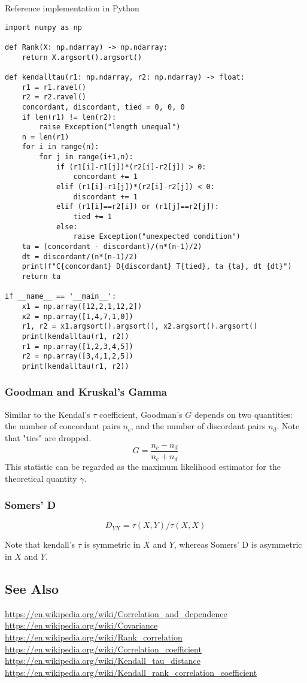 Reference implementation in Python
\begin{verbatim}
import numpy as np

def Rank(X: np.ndarray) -> np.ndarray:
    return X.argsort().argsort()

def kendalltau(r1: np.ndarray, r2: np.ndarray) -> float:
    r1 = r1.ravel()
    r2 = r2.ravel()
    concordant, discordant, tied = 0, 0, 0
    if len(r1) != len(r2):
        raise Exception("length unequal")
    n = len(r1)
    for i in range(n):
        for j in range(i+1,n):
            if (r1[i]-r1[j])*(r2[i]-r2[j]) > 0:
                concordant += 1
            elif (r1[i]-r1[j])*(r2[i]-r2[j]) < 0:
                discordant += 1
            elif (r1[i]==r2[i]) or (r1[j]==r2[j]):
                tied += 1
            else:
                raise Exception("unexpected condition")
    ta = (concordant - discordant)/(n*(n-1)/2)
    dt = discordant/(n*(n-1)/2)
    print(f"C{concordant} D{discordant} T{tied}, ta {ta}, dt {dt}")
    return ta

if __name__ == '__main__':
    x1 = np.array([12,2,1,12,2])
    x2 = np.array([1,4,7,1,0])
    r1, r2 = x1.argsort().argsort(), x2.argsort().argsort()
    print(kendalltau(r1, r2))
    r1 = np.array([1,2,3,4,5])
    r2 = np.array([3,4,1,2,5])
    print(kendalltau(r1, r2))
\end{verbatim}

\subsubsection{Goodman and Kruskal's Gamma}

Similar to the Kendal's $\tau$ coefficient, Goodman's $G$ depends on two
quantities: the number of concordant pairs $n_c$, and the number of discordant
pairs $n_d$. Note that "ties" are dropped.  $$ G = \frac{n_c-n_d}{n_c+n_d} $$
This statistic can be regarded as the maximum likelihood estimator for the
theoretical quantity $\gamma$.

\subsubsection{Somers' D}

$$ D_{YX} = \tau(X,Y)/\tau(X,X) $$

Note that kendall's $\tau$ is symmetric in $X$ and $Y$, whereas Somers' D is
asymmetric in $X$ and $Y$.

\subsection{See Also}

\url{https://en.wikipedia.org/wiki/Correlation_and_dependence}
\url{https://en.wikipedia.org/wiki/Covariance}
\url{https://en.wikipedia.org/wiki/Rank_correlation}
\url{https://en.wikipedia.org/wiki/Correlation_coefficient}
\url{https://en.wikipedia.org/wiki/Kendall_tau_distance}
\url{https://en.wikipedia.org/wiki/Kendall_rank_correlation_coefficient}
